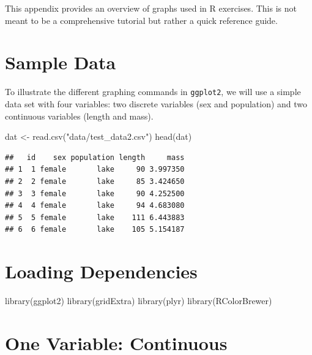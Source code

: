 \documentclass[
]{book}
\newenvironment{Shaded}{\begin{snugshade}}{\end{snugshade}}
\newcommand{\FunctionTok}[1]{\textcolor[rgb]{0.00,0.00,0.00}{#1}}
\newcommand{\NormalTok}[1]{#1}
\newcommand{\OtherTok}[1]{\textcolor[rgb]{0.56,0.35,0.01}{#1}}
\newcommand{\StringTok}[1]{\textcolor[rgb]{0.31,0.60,0.02}{#1}}
\begin{document}
This appendix provides an overview of graphs used in R exercises. This is not meant to be a comprehensive tutorial but rather a quick reference guide.

\hypertarget{sample-data}{%
\section{Sample Data}\label{sample-data}}

To illustrate the different graphing commands in \texttt{ggplot2}, we will use a simple data set with four variables: two discrete variables (sex and population) and two continuous variables (length and mass).

\begin{Shaded}
\begin{Highlighting}[]
\NormalTok{dat }\OtherTok{\textless{}{-}} \FunctionTok{read.csv}\NormalTok{(}\StringTok{"data/test\_data2.csv"}\NormalTok{)}
\FunctionTok{head}\NormalTok{(dat)}
\end{Highlighting}
\end{Shaded}

\begin{verbatim}
##   id    sex population length     mass
## 1  1 female       lake     90 3.997350
## 2  2 female       lake     85 3.424650
## 3  3 female       lake     90 4.252500
## 4  4 female       lake     94 4.683080
## 5  5 female       lake    111 6.443883
## 6  6 female       lake    105 5.154187
\end{verbatim}

\hypertarget{loading-dependencies}{%
\section{Loading Dependencies}\label{loading-dependencies}}

\begin{Shaded}
\begin{Highlighting}[]
\FunctionTok{library}\NormalTok{(ggplot2)}
\FunctionTok{library}\NormalTok{(gridExtra)}
\FunctionTok{library}\NormalTok{(plyr)}
\FunctionTok{library}\NormalTok{(RColorBrewer)}
\end{Highlighting}
\end{Shaded}

\hypertarget{one-variable-continuous}{%
\section{One Variable: Continuous}\label{one-variable-continuous}}
\end{document}
